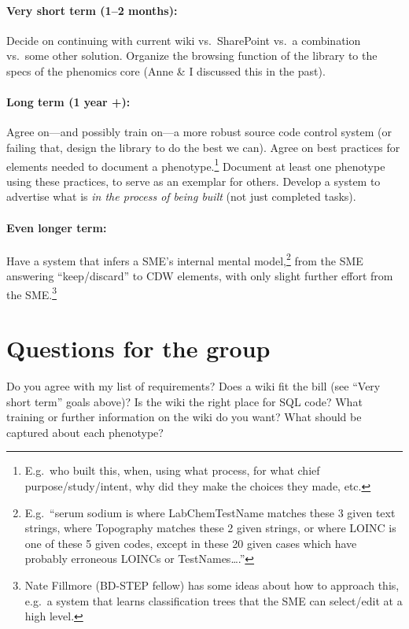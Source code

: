 \documentclass{tufte-handout}
\begin{document}
\paragraph{Very short term (1--2 months):}
Decide on continuing with current wiki vs.\ SharePoint vs.\ a
combination vs.\ some other solution. Organize the browsing function
of the library to the specs of the phenomics core (Anne \& I discussed
this in the past).

\paragraph{Long term (1 year +):}
Agree on---and possibly train on---a more robust source code control
system (or failing that, design the library to do the best we can).
Agree on best practices for elements needed to document a
phenotype.\footnote{E.g.\ who built this, when, using what process,
  for what chief purpose/study/intent, why did they make the choices
  they made, etc.} Document at least one phenotype using these
practices, to serve as an exemplar for others. Develop a system to
advertise what is \emph{in the process of being built} (not just
completed tasks).

\paragraph{Even longer term:}
Have a system that infers a SME's internal mental
model,\footnote{E.g.\ ``serum sodium is where LabChemTestName matches
  these 3 given text strings, where Topography matches these 2 given
  strings, or where LOINC is one of these 5 given codes, except in
  these 20 given cases which have probably erroneous LOINCs or
  TestNames\ldots{}.''} from the SME answering ``keep/discard'' to CDW
elements, with only slight further effort from the SME.\footnote{Nate
  Fillmore (BD-STEP fellow) has some ideas about how to approach this,
  e.g.\ a system that learns classification trees that the SME can
  select/edit at a high level.}

\section{Questions for the group}

Do you agree with my list of requirements? Does a wiki fit the bill
(see ``Very short term'' goals above)? Is the wiki the right place for
SQL code? What training or further information on the wiki do you
want? What should be captured about each phenotype?
\end{document}
